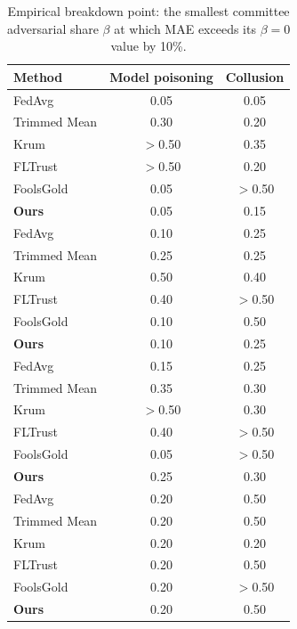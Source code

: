 \begin{table}[t]
\centering
\scriptsize
\caption{Empirical breakdown point: the smallest committee adversarial share $\beta$ at which MAE exceeds its $\beta=0$ value by 10\%.}
\label{tab:breakdown}
\begin{tabular}{lcc}
\toprule
\textbf{Method} & \textbf{Model poisoning} & \textbf{Collusion} \\
\midrule
FedAvg & 0.05 & 0.05 \\
Trimmed Mean & 0.30 & 0.20 \\
Krum & $>$0.50 & 0.35 \\
FLTrust & $>$0.50 & 0.20 \\
FoolsGold & 0.05 & $>$0.50 \\
\textbf{Ours} & 0.05 & 0.15 \\
FedAvg & 0.10 & 0.25 \\
Trimmed Mean & 0.25 & 0.25 \\
Krum & 0.50 & 0.40 \\
FLTrust & 0.40 & $>$0.50 \\
FoolsGold & 0.10 & 0.50 \\
\textbf{Ours} & 0.10 & 0.25 \\
FedAvg & 0.15 & 0.25 \\
Trimmed Mean & 0.35 & 0.30 \\
Krum & $>$0.50 & 0.30 \\
FLTrust & 0.40 & $>$0.50 \\
FoolsGold & 0.05 & $>$0.50 \\
\textbf{Ours} & 0.25 & 0.30 \\
FedAvg & 0.20 & 0.50 \\
Trimmed Mean & 0.20 & 0.50 \\
Krum & 0.20 & 0.20 \\
FLTrust & 0.20 & 0.50 \\
FoolsGold & 0.20 & $>$0.50 \\
\textbf{Ours} & 0.20 & 0.50 \\
\bottomrule
\end{tabular}
\end{table}
